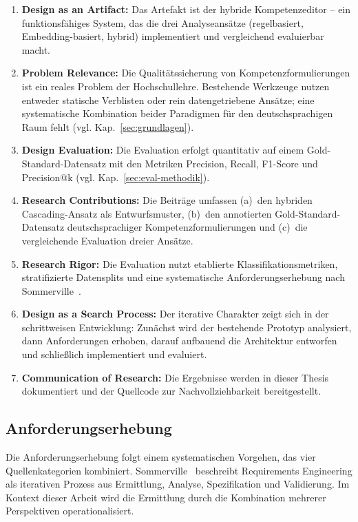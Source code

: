\begin{enumerate}
  \item \textbf{Design as an Artifact:} Das Artefakt ist der hybride Kompetenzeditor -- ein funktionsfähiges System, das die drei Analyseansätze (regelbasiert, Embedding-basiert, hybrid) implementiert und vergleichend evaluierbar macht.
  \item \textbf{Problem Relevance:} Die Qualitätssicherung von Kompetenzformulierungen ist ein reales Problem der Hochschullehre. Bestehende Werkzeuge nutzen entweder statische Verblisten oder rein datengetriebene Ansätze; eine systematische Kombination beider Paradigmen für den deutschsprachigen Raum fehlt (vgl. Kap.~\ref{sec:grundlagen}).
  \item \textbf{Design Evaluation:} Die Evaluation erfolgt quantitativ auf einem Gold-Standard-Datensatz mit den Metriken Precision, Recall, F1-Score und Precision@k (vgl. Kap.~\ref{sec:eval-methodik}).
  \item \textbf{Research Contributions:} Die Beiträge umfassen (a)~den hybriden Cascading-Ansatz als Entwurfsmuster, (b)~den annotierten Gold-Standard-Datensatz deutschsprachiger Kompetenzformulierungen und (c)~die vergleichende Evaluation dreier Ansätze.
  \item \textbf{Research Rigor:} Die Evaluation nutzt etablierte Klassifikationsmetriken, stratifizierte Datensplits und eine systematische Anforderungserhebung nach Sommerville~\cite{sommerville2016software}.
  \item \textbf{Design as a Search Process:} Der iterative Charakter zeigt sich in der schrittweisen Entwicklung: Zunächst wird der bestehende Prototyp analysiert, dann Anforderungen erhoben, darauf aufbauend die Architektur entworfen und schließlich implementiert und evaluiert.
  \item \textbf{Communication of Research:} Die Ergebnisse werden in dieser Thesis dokumentiert und der Quellcode zur Nachvollziehbarkeit bereitgestellt.
\end{enumerate}

\subsection{Anforderungserhebung}\label{sec:anforderungen}

Die Anforderungserhebung folgt einem systematischen Vorgehen, das vier Quellenkategorien kombiniert.
Sommerville~\cite{sommerville2016software} beschreibt Requirements Engineering als iterativen Prozess aus Ermittlung, Analyse, Spezifikation und Validierung.
Im Kontext dieser Arbeit wird die Ermittlung durch die Kombination mehrerer Perspektiven operationalisiert.

